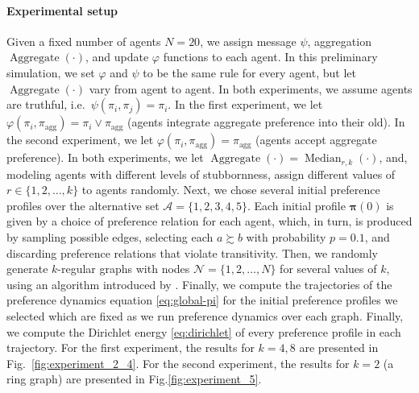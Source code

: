 \documentclass[conference]{ieeeconf}
\newcommand{\N}{\mathcal{N}}
\newcommand{\A}{\mathcal{A}}
\newcommand{\prefers}{\succsim}
\newcommand{\profile}{\boldsymbol{\pi}}
\newcommand{\join}{\vee}
\DeclareMathOperator{\Aggregate}{Aggregate}
\DeclareMathOperator{\Median}{Median}
\begin{document}
\paragraph*{Experimental setup}
 Given a fixed number of agents $N=20$, we assign message $\psi$, aggregation $\Aggregate(\cdot)$, and update $\varphi$ functions to each agent. In this preliminary simulation, we set $\varphi$ and $\psi$ to be the same rule for every agent, but let $\Aggregate(\cdot)$ vary from agent to agent. In both experiments, we assume agents are truthful, i.e.~$\psi(\pi_i,\pi_j) = \pi_i$. In the first experiment, we let $\varphi(\pi_i,\pi_{\mathrm{agg}}) = \pi_i \join \pi_{\mathrm{agg}}$ (agents integrate aggregate preference into their old). In the second experiment, we let $\varphi(\pi_i,\pi_{\mathrm{agg}}) = \pi_{\mathrm{agg}}$ (agents accept aggregate preference). In both experiments, we let $\Aggregate(\cdot) = \Median_{r,k}(\cdot)$, and, modeling agents with different levels of stubbornness, assign different values of $r \in \{1,2,\dots,k\}$ to agents randomly. Next, we chose several initial preference profiles over the alternative set $\A = \{1,2,3,4,5\}$. Each initial profile $\profile(0)$ is given by a choice of preference relation for each agent, which, in turn, is produced by sampling possible edges, selecting each $a \prefers b$ with probability $p=0.1$, and discarding preference relations that violate transitivity. Then, we randomly generate $k$-regular graphs with nodes $\N = \{1,2,\dots,N\}$ for several values of $k$, using an algorithm introduced by \cite{kim2003}. Finally, we compute the trajectories of the preference dynamics equation \eqref{eq:global-pi} for the initial preference profiles we selected which are fixed as we run preference dynamics over each graph. Finally, we compute the Dirichlet energy \eqref{eq:dirichlet} of every preference profile in each trajectory. For the first experiment, the results for $k = 4,8$ are presented in Fig.~\ref{fig:experiment_2_4}. For the second experiment, the results for $k=2$ (a ring graph) are presented in Fig.\ref{fig:experiment_5}.
\end{document}
